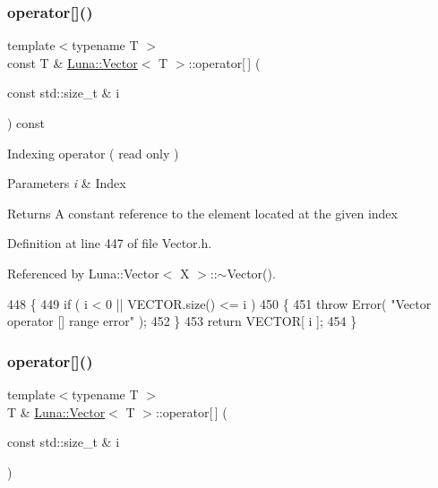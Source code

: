 \subsubsection{\texorpdfstring{operator[]()}{operator[]()}\hspace{0.1cm}{\footnotesize\ttfamily [1/2]}}
{\footnotesize\ttfamily template$<$typename T $>$ \\
const T \& \hyperlink{classLuna_1_1Vector}{Luna\+::\+Vector}$<$ T $>$\+::operator\mbox{[}$\,$\mbox{]} (\begin{DoxyParamCaption}\item[{const std\+::size\+\_\+t \&}]{i }\end{DoxyParamCaption}) const\hspace{0.3cm}{\ttfamily [inline]}}



Indexing operator ( read only ) 


\begin{DoxyParams}{Parameters}
{\em i} & Index \\
\hline
\end{DoxyParams}
\begin{DoxyReturn}{Returns}
A constant reference to the element located at the given index 
\end{DoxyReturn}


Definition at line 447 of file Vector.\+h.



Referenced by Luna\+::\+Vector$<$ X $>$\+::$\sim$\+Vector().


\begin{DoxyCode}
448   \{
449     \textcolor{keywordflow}{if} ( i < 0 || VECTOR.size() <= i )
450     \{
451       \textcolor{keywordflow}{throw} Error( \textcolor{stringliteral}{"Vector operator [] range error"} );
452     \}
453     \textcolor{keywordflow}{return} VECTOR[ i ];
454   \}
\end{DoxyCode}
\mbox{\label{classLuna_1_1Vector_ae4e2ff0ca1e504e31453f436f6f733c1}} 
\subsubsection{\texorpdfstring{operator[]()}{operator[]()}\hspace{0.1cm}{\footnotesize\ttfamily [2/2]}}
{\footnotesize\ttfamily template$<$typename T $>$ \\
T \& \hyperlink{classLuna_1_1Vector}{Luna\+::\+Vector}$<$ T $>$\+::operator\mbox{[}$\,$\mbox{]} (\begin{DoxyParamCaption}\item[{const std\+::size\+\_\+t \&}]{i }\end{DoxyParamCaption})\hspace{0.3cm}{\ttfamily [inline]}}



